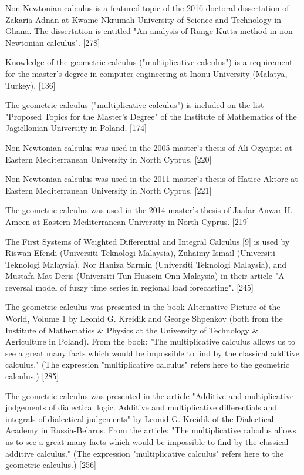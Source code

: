 \documentclass[12pt]{article}
\begin{document}
Non-Newtonian calculus is a featured topic of the 2016 doctoral dissertation of Zakaria Adnan at Kwame Nkrumah University of Science and Technology in Ghana. The dissertation is entitled "An analysis of Runge-Kutta method in non-Newtonian calculus". [278]

Knowledge of the geometric calculus ("multiplicative calculus") is a requirement for the master's degree in computer-engineering at Inonu University (Malatya, Turkey). [136]

The geometric calculus ("multiplicative calculus") is included on the list "Proposed Topics for the Master's Degree" of the Institute of Mathematics of the Jagiellonian University in Poland. [174]

Non-Newtonian calculus was used in the 2005 master's thesis of Ali Ozyapici at Eastern Mediterranean University in North Cyprus. [220]

Non-Newtonian calculus was used in the 2011 master's thesis of Hatice Aktore at Eastern Mediterranean University in North Cyprus. [221]

The geometric calculus was used in the 2014 master's thesis of Jaafar Anwar H. Ameen at Eastern Mediterranean University in North Cyprus. [219]

The First Systems of Weighted Differential and Integral Calculus [9] is used by Riswan Efendi (Universiti Teknologi Malaysia), Zuhaimy Ismail (Universiti Teknologi Malaysia), Nor Haniza Sarmin (Universiti Teknologi Malaysia), and Mustafa Mat Deris (Universiti Tun Hussein Onn Malaysia) in their article "A reversal model of fuzzy time series in regional load forecasting". [245]

The geometric calculus was presented in the book Alternative Picture of the World, Volume 1 by Leonid G. Kreidik and George Shpenkov (both from the Institute of Mathematics & Physics at the University of Technology & Agriculture in Poland). From the book: "The multiplicative calculus allows us to see a great many facts which would be impossible to find by the classical additive calculus." (The expression "multiplicative calculus" refers here to the geometric calculus.) [285]

The geometric calculus was presented in the article "Additive and multiplicative judgements of dialectical logic. Additive and multiplicative differentials and integrals of dialectical judgements" by Leonid G. Kreidik of the Dialectical Academy in Russia-Belarus. From the article: "The multiplicative calculus allows us to see a great many facts which would be impossible to find by the classical additive calculus." (The expression "multiplicative calculus" refers here to the geometric calculus.) [256]
\end{document}

